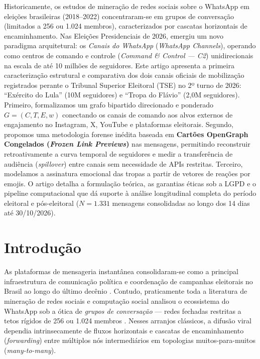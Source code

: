 \documentclass[12pt]{article}
\begin{document}
\begin{resumo}
Historicamente, os estudos de mineração de redes sociais sobre o WhatsApp em eleições brasileiras (2018--2022) concentraram-se em grupos de conversação (limitados a 256 ou 1.024 membros), caracterizados por cascatas horizontais de encaminhamento. Nas Eleições Presidenciais de 2026, emergiu um novo paradigma arquitetural: os \textit{Canais do WhatsApp} (\textit{WhatsApp Channels}), operando como centros de comando e controle (\textit{Command \& Control --- C2}) unidirecionais na escala de até 10 milhões de seguidores. Este artigo apresenta a primeira caracterização estrutural e comparativa dos dois canais oficiais de mobilização registrados perante o Tribunal Superior Eleitoral (TSE) no 2º turno de 2026: ``Exército do Lula'' (10M seguidores) e ``Tropa do Flávio'' (2,0M seguidores). Primeiro, formalizamos um grafo bipartido direcionado e ponderado $G = (C, T, E, w)$ conectando os canais de comando aos alvos externos de engajamento no Instagram, X, YouTube e plataformas eleitorais. Segundo, propomos uma metodologia forense inédita baseada em \textbf{Cartões OpenGraph Congelados (\textit{Frozen Link Previews})} nas mensagens, permitindo reconstruir retroativamente a curva temporal de seguidores e medir a transferência de audiência (\textit{spillover}) entre canais sem necessidade de APIs restritas. Terceiro, modelamos a assinatura emocional das tropas a partir de vetores de reações por emojis. O artigo detalha a formulação teórica, as garantias éticas sob a LGPD e o pipeline computacional que dá suporte à análise longitudinal completa do período eleitoral e pós-eleitoral ($N=1.331$ mensagens consolidadas ao longo dos 14 dias até 30/10/2026).
\end{resumo}

\section{Introdução}\label{sec:introducao}

As plataformas de mensageria instantânea consolidaram-se como a principal infraestrutura de comunicação política e coordenação de campanhas eleitorais no Brasil ao longo do último decênio \cite{resende2019whatsapp,melo2019whatsapp,melo2021sticker}. Contudo, praticamente toda a literatura de mineração de redes sociais e computação social analisou o ecossistema do WhatsApp sob a ótica de \textit{grupos de conversação} --- redes fechadas restritas a tetos rígidos de 256 ou 1.024 membros \cite{junqueira2025telegram,cunha2024polarizacao}. Nesses arranjos clássicos, a difusão viral dependia intrinsecamente de fluxos horizontais e cascatas de encaminhamento (\textit{forwarding}) entre múltiplos nós intermediários em topologias muitos-para-muitos (\textit{many-to-many}).
\end{document}
